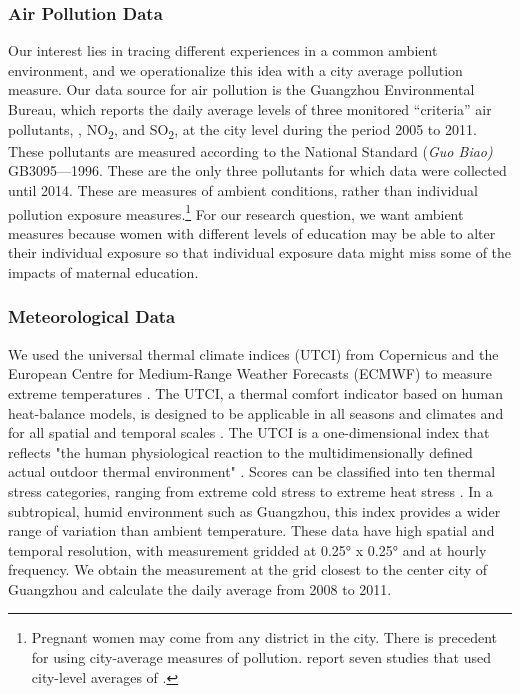 \subsubsection{Air Pollution Data \label{air-pollution-data}}

Our interest lies in tracing different experiences in a common ambient environment, and we operationalize this idea with a city average pollution measure.  Our data source for air pollution is the Guangzhou Environmental Bureau,
which reports the daily average levels of three monitored ``criteria''
air pollutants, \PARPMTEN, NO\textsubscript{2}, and SO\textsubscript{2}, at the city level during the period
2005 to 2011. These pollutants are measured according to the National
Standard (\emph{Guo Biao)} GB3095---1996. These are the only three pollutants for which data were collected until
2014.
These are measures of ambient conditions, rather than individual pollution exposure measures.\footnote{Pregnant women may come from any district in the city.  There is precedent
  for using city-average measures of pollution. \textcite{zhao_ambient_2015}
  report seven studies that used city-level averages of \PARPMTEN \autocite{sagiv_sharon_k_time_2005, hansen_maternal_2006, jiang_time_2007, darrow_ambient_2009, suh_different_2009, zhao_effects_2011, schifano_effect_2013-1}.}  For our research question, we want ambient measures because women with different levels of education may be able to alter their individual exposure so that individual exposure data might miss some of the impacts of maternal education. 
 
\subsubsection{Meteorological Data\label{meteorological-data}}

We used the universal thermal climate indices (UTCI) from Copernicus and the European Centre for Medium-Range Weather Forecasts (ECMWF) to measure
extreme temperatures \autocite{copernicus_universal_2020}. The UTCI, a thermal comfort indicator
based on human heat-balance models, is designed to be applicable in all
seasons and climates and for all spatial and temporal scales \autocite{copernicus_universal_2020}.
The UTCI is a one-dimensional index that reflects "the human
physiological reaction to the multidimensionally defined actual outdoor
thermal environment" \autocite[481]{brode_deriving_2012}. Scores can be classified
into ten thermal stress categories, ranging from extreme cold stress to
extreme heat stress \autocite{copernicus_universal_2020}. In a subtropical, humid environment
such as Guangzhou, this index provides a wider range of variation than
ambient temperature. These data have high spatial and temporal resolution, with measurement gridded at 0.25° x 0.25° and at hourly frequency. We obtain the measurement at the grid closest to the center city of Guangzhou and calculate the daily average from 2008 to 2011. 

